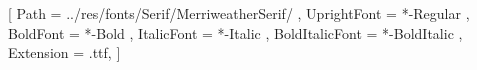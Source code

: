 \setmainfont{Merriweather}
[
	Path = ../res/fonts/Serif/MerriweatherSerif/ ,
	UprightFont = *-Regular ,
	BoldFont = *-Bold ,
	ItalicFont = *-Italic ,
	BoldItalicFont = *-BoldItalic ,
	Extension = .ttf,
]